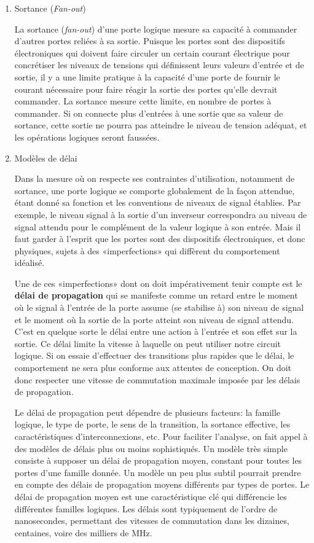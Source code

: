 \documentclass[letter, oneside]{book}
\begin{document}
\begin{enumerate}
\item Sortance (\emph{Fan-out})
\label{sec:org4300186}

La sortance (\emph{fan-out}) d'une porte logique mesure sa capacité à commander
d'autres portes reliées à sa sortie. Puisque les portes sont des
dispositifs électroniques qui doivent faire circuler un certain
courant électrique pour concrétiser les niveaux de tensions qui
définissent leurs valeurs d'entrée et de sortie, il y a une limite
pratique à la capacité d'une porte de fournir le courant nécessaire
pour faire réagir la sortie des portes qu'elle devrait commander. La sortance 
mesure cette limite, en nombre de portes à commander. Si on
connecte plus d'entrées à une sortie que sa valeur de sortance, cette
sortie ne pourra pas atteindre le niveau de tension adéquat, et les
opérations logiques seront faussées.

\item Modèles de délai
\label{sec:orge977ad3}

Dans la mesure où on respecte ses contraintes d'utilisation, notamment
de sortance, une porte logique se comporte globalement de la façon
attendue, étant donné sa fonction et les conventions de niveaux de
signal établies. Par exemple, le niveau signal à la sortie d'un
inverseur correspondra au niveau de signal attendu pour le complément
de la valeur logique à son entrée. Mais il faut garder à l'esprit que
les portes sont des dispositifs électroniques, et donc physiques,
sujets à des «imperfections» qui diffèrent du comportement idéalisé.

Une de ces «imperfections» dont on doit impérativement tenir compte
est le \textbf{délai de propagation} qui se manifeste comme un retard entre
le moment où le signal à l'entrée de la porte assume (se stabilise à)
son niveau de signal et le moment où la sortie de la porte atteint
son niveau de signal attendu. C'est en quelque sorte le délai entre
une action à l'entrée et son effet sur la sortie. Ce délai limite la
vitesse à laquelle on peut utiliser notre circuit logique. Si on
essaie d'effectuer des transitions plus rapides que le délai, le
comportement ne sera plus conforme aux attentes de conception. On doit
donc respecter une vitesse de commutation maximale imposée par les
délais de propagation.

Le délai de propagation peut dépendre de plusieurs facteurs: la
famille logique, le type de porte, le sens de la transition, la
sortance effective, les caractéristiques d'interconnexions, etc. Pour
faciliter l'analyse, on fait appel à des modèles de délais plus ou
moins sophistiqués. Un modèle très simple consiste à supposer un délai
de propagation moyen, constant pour toutes les portes d'une famille
donnée. Un modèle un peu plus subtil pourrait prendre en compte des
délais de propagation moyens différents par types de portes. Le délai
de propagation moyen est une caractéristique clé qui différencie les
différentes familles logiques. Les délais sont typiquement de l'ordre
de nanosecondes, permettant des vitesses de commutation dans les
dizaines, centaines, voire des milliers de MHz.


\end{enumerate}
\end{document}

